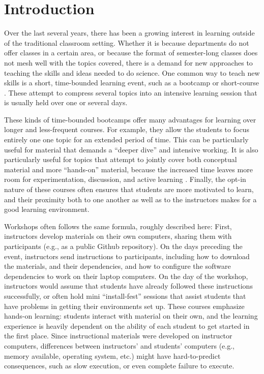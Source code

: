 \section{Introduction}

Over the last several years, there has been a growing interest in learning
outside of the traditional classroom setting. Whether it is because departments
do not offer classes in a certain area, or because the format of semester-long
classes does not mesh well with the topics covered, there is a demand for new
approaches to teaching the skills and ideas needed to do science. One common way
to teach new skills is a short, time-bounded learning event, such as a bootcamp
or short-course \cite{wilson2016software}. These attempt to compress several
topics into an intensive learning session that is usually held over one or
several days.

These kinds of time-bounded bootcamps offer many advantages for learning over
longer and less-frequent courses. For example, they allow the students to focus
entirely one one topic for an extended period of time. This can be particularly
useful for material that demands a ``deeper dive'' and intensive working. It is
also particularly useful for topics that attempt to jointly cover both
conceptual material and more ``hands-on'' material, because the increased time
leaves more room for experimentation, discussion, and active learning
\citep{Bransford2000-lu, Papert1980-fh}. Finally, the opt-in nature of these
courses often ensures that students are more motivated to learn, and their
proximity both to one another as well as to the instructors makes for a good
learning environment.

Workshops often follows the same formula, roughly described here: First,
instructors develop materials on their own computers, sharing them with
participants (e.g., as a public Github repository). On the days preceding the
event, instructors send instructions to participants, including how to download
the materials, and their dependencies, and how to configure the software
dependencies to work on their laptop computers. On the day of the workshop,
instructors would assume that students have already followed these instructions
successfully, or often hold mini ``install-fest'' sessions that assist students
that have problems in getting their environments set up. These courses emphasize
hands-on learning: students interact with material on their own, and the
learning experience is heavily dependent on the ability of each student to get
started in the first place. Since instructional materials were developed on
instructor computers, differences between instructors' and students' computers
(e.g., memory available, operating system, etc.) might have hard-to-predict
consequences, such as slow execution, or even complete failure to execute.

